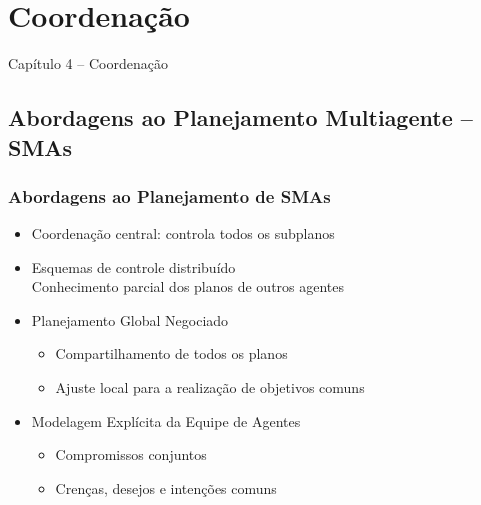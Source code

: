 
\section{Coordenação}
\begin{frame}

\begin{center}
{\huge Capítulo 4 -- Coordenação}
\end{center}

\end{frame}


\subsection{Abordagens ao Planejamento Multiagente -- SMAs}

\begin{frame}
\frametitle{Abordagens ao Planejamento de SMAs}

\begin{block}{}
 
\begin{itemize}
  \item Coordenação central: controla todos os subplanos
  \item Esquemas de controle distribuído\\
        Conhecimento parcial dos planos de outros agentes
  \item Planejamento Global Negociado

\begin{itemize}
  \item Compartilhamento de todos os planos
  \item Ajuste local para a realização de objetivos comuns

\end{itemize}

\item Modelagem Explícita da Equipe de Agentes
\begin{itemize}
  \item Compromissos conjuntos
   \item Crenças, desejos e intenções comuns

\end{itemize}
\end{itemize}
\end{block}

\end{frame}

